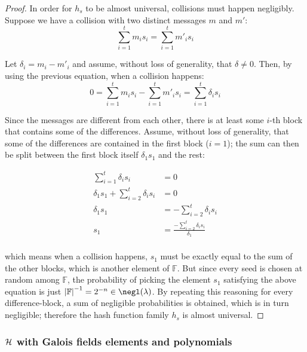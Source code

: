 \begin{proof}

    In order for $h_s$ to be almost universal, collisions must happen negligibly. Suppose we have a collision with two distinct messages $m$ and $m'$:
    \[
        \sum_{i = 1}^t m_i s_i = \sum_{i = 1}^t m'_i s_i
    \]

    Let $\delta_i = m_i - m'_i$ and assume, without loss of generality, that $\delta \neq 0$. Then, by using the previous equation, when a collision happens:
    \[
        0 = \sum_{i = 1}^t m_i s_i - \sum_{i = 1}^t m'_i s_i = \sum_{i = 1}^t \delta_i s_i
    \]

    Since the messages are different from each other, there is at least some $i$-th block that contains some of the differences. Assume, without loss of generality, that some of the differences are contained in the first block ($i = 1$); the sum can then be split between the first block itself $\delta_1 s_1$ and the rest:

    \begin{align*}
        \sum_{i = 1}^t \delta_i s_i                     &= 0                                                \\
        \delta_1 s_1 + \sum_{i = 2}^{t} \delta_i s_i    &= 0                                                \\
        \delta_ 1 s_1                                   &= -\sum_{i = 2}^{t} \delta_i s_i                   \\
        s_1                                             &= \frac{-\sum_{i = 2}^{t} \delta_i s_i}{\delta_1}  \\
    \end{align*}

    which means when a collision happens, $s_1$ must be exactly equal to the sum of the other blocks, which is another element of $\mathbb{F}$. But since every seed is chosen at random among $\mathbb{F}$, the probability of picking the element $s_1$ satisfying the above equation is just $\left|\mathbb{F}\right|^{-1} = 2^{-n} \in \negl(\lambda)$. By repeating this reasoning for every difference-block, a sum of negligible probabilities is obtained, which is in turn negligible; therefore the hash function family $h_s$ is almost universal.

\end{proof}

\subsubsection{$\mathcal{H}$ with Galois fields elements and polynomials}

